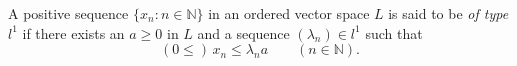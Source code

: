 A positive sequence $\{x_n: n \in \mathbb{N}\}$ in an ordered vector space $L$ is said to be \textit{of type $l^1$} if there exists an $a \geq 0$ in $L$ and a sequence $(\lambda_n) \in l^1$ such that
$$(0 \leq)\, x_n \leq \lambda_n a \qquad (n \in \mathbb{N}).$$
